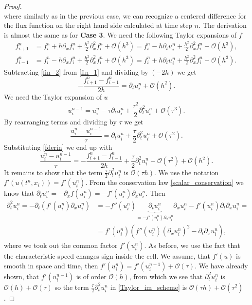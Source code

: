 \documentclass[../include.tex]{subfiles}
\begin{document}
\begin{proof}
\[\]
where similarly as in the previous case, we can recognize a centered difference for the flux function on the right hand side calculated at time step $ n $. The derivation is almost the same as for \textbf{Case 3}.
We need the following Taylor expansions of $ f $
\begin{align}
	f_{i+1}^{n} &= f_i^{n} + h \partial_x f_i^{n} + \frac{h^2}{2} \partial_x^2 f_i^{n} + \mathcal{O}(h^3) = 
	f_i^{n} - h \partial_t u_i^{n} + \frac{h^2}{2} \partial_x^2 f_i^{n} + \mathcal{O}(h^3),\label{fin_1}\\
	f_{i-1}^n &= f_i^n - h\partial_x f_i^n + \frac{h^2}{2}\partial_x^2 f_i^n + \mathcal{O}(h^3) = f_i^n + h\partial_t u_i^n + \frac{h^2}{2}\partial_x^2 f_i^n + \mathcal{O}(h^3).
	\label{fin_2}
\end{align}
Subtracting \eqref{fin_2} from \eqref{fin_1} and dividing by $ (-2h) $ we get
\begin{equation}
	\label{fderin}
	-\frac{f_{i+1}^{n} - f_{i-1}^n}{2h} = \partial_t u_i^{n} + \mathcal{O}(h^2).
\end{equation}
We need the Taylor expansion of $ u $
\begin{equation}
	u_i^{n-1} = u_i^{n} - \tau \partial_t u_i^n + \frac{\tau^2}{2}\partial_t^2 u_i^n + \mathcal{O}(\tau^3).
	\label{uin}
\end{equation}
By rearranging terms and dividing by $ \tau $ we get
\begin{equation}
	\frac{u_i^{n} -  u_i^{n-1}}{\tau} = \partial_t u_i^n + \frac{\tau}{2}\partial_t^2 u_i^n + \mathcal{O}(\tau^2).
\end{equation}
Substituting \eqref{fderin} we end up with
\begin{equation}
	\label{Taylor_im_scheme}
	\frac{u_i^{n} -  u_i^{n-1}}{\tau} = -\frac{f_{i+1}^{n} - f_{i-1}^n}{2h} + \frac{\tau}{2}\partial_t^2 u_i^n + \mathcal{O}(\tau^2) + \mathcal{O}(h^2).
\end{equation}
It remains to show that the term $ \frac{\tau}{2}\partial_t^2 u_i^n $ is $ \mathcal{O}(\tau h) $. We use the notation $ f'(u(t^n, x_i)) = f'(u_i^n) $. From the conservation law \eqref{scalar_conservation} we know that $ \partial_t u_i^n = -\partial_x f(u_i^n) = - f'(u_i^n) \partial_x u_i^n $. Then
\begin{align}
	\partial^2_t u_i^n = - \partial_t \left(f'(u_i^n) \partial_x u_i^n\right) &=
	- f''(u_i^n) \underbrace{\partial_t u_i^n}_{=- f'(u_i^n) \partial_x u_i^n} \partial_x u_i^n - f'(u_i^n) \partial_t \partial_x u_i^n=\nonumber\\
	&= f'(u_i^n) \left(f''(u_i^n) (\partial_x u_i^n)^2 - \partial_t \partial_x u_i^n\right),
\end{align}
where we took out the common factor $ f'(u_i^n) $. As before, we use the fact that the characteristic speed changes sign inside the cell. We assume, that $ f'(u) $ is smooth in space and time, then $ f'(u_i^{n}) = f'(u_i^{n-1}) + \mathcal{O}(\tau) $. We have already shown, that $ f'(u_i^{n-1}) $ is of order $ \mathcal{O}(h) $, from which we see that $ \partial_t^2 u_i^n $ is $ \mathcal{O}(h) + \mathcal{O}(\tau) $ so the term $ \frac{\tau}{2}\partial_t^2 u_i^n $ in \eqref{Taylor_im_scheme} is $ \mathcal{O}(\tau h) + \mathcal{O}(\tau^2) $.
\end{proof}
\end{document}
